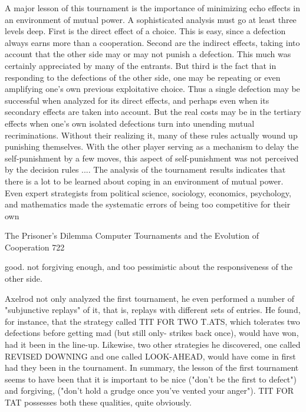          A major lesson of this tournament is the importance of minimizing echo effects in an
environment of mutual power. A sophisticated analysis must go at least three levels deep. First is
the direct effect of a choice. This is easy, since a defection always earns more than a cooperation.
Second are the indirect effects, taking into account that the other side may or may not punish a
defection. This much was certainly appreciated by many of the entrants. But third is the fact that
in responding to the defections of the other side, one may be repeating or even amplifying one's
own previous exploitative choice. Thus a single defection may be successful when analyzed for
its direct effects, and perhaps even when its secondary effects are taken into account. But the real
costs may be in the tertiary effects when one's own isolated defections turn into unending mutual
recriminations. Without their realizing it, many of these rules actually wound up punishing
themselves. With the other player serving as a mechanism to delay the self-punishment by a few
moves, this aspect of self-punishment was not perceived by the decision rules ....
         The analysis of the tournament results indicates that there is a lot to be learned about
coping in an environment of mutual power. Even expert strategists from political science,
sociology, economics, psychology, and mathematics made the systematic errors of being too
competitive for their own




The Prisoner's Dilemma Computer Tournaments and the Evolution of Cooperation                   722

good. not forgiving enough, and too pessimistic about the responsiveness of the other side.

        Axelrod not only analyzed the first tournament, he even performed a number of
"subjunctive replays" of it, that is, replays with different sets of entries. He found, for
instance, that the strategy called TIT FOR TWO T.ATS, which tolerates two defections
before getting mad (but still only- strikes back once), would have won, had it been in the
line-up. Likewise, two other strategies he discovered, one called REVISED DOWNING
and one called LOOK-AHEAD, would have come in first had they been in the
tournament.
        In summary, the lesson of the first tournament seems to have been that it is
important to be nice ("don't be the first to defect") and forgiving, ("don't hold a grudge
once you've vented your anger"). TIT FOR TAT possesses both these qualities, quite
obviously.

